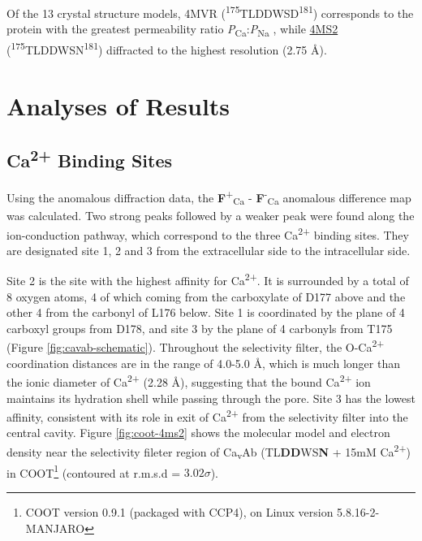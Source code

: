 \documentclass[
]{article}
\begin{document}
Of the 13 crystal structure models, 4MVR (\textsuperscript{175}TLDDWSD\textsuperscript{181}) corresponds to the protein with the greatest permeability ratio \emph{P}\textsubscript{Ca}:\emph{P}\textsubscript{Na} , while \href{https://www.rcsb.org/structure/4MS2}{4MS2} (\textsuperscript{175}TLDDWSN\textsuperscript{181}) diffracted to the highest resolution (2.75 Å).

\hypertarget{analyses-of-results}{%
\section{Analyses of Results}\label{analyses-of-results}}

\hypertarget{ca2-binding-sites}{%
\subsection{\texorpdfstring{Ca\textsuperscript{2+} Binding Sites}{Ca2+ Binding Sites}}\label{ca2-binding-sites}}

Using the anomalous diffraction data, the \textbf{F}\textsuperscript{+}\textsubscript{Ca} - \textbf{F}\textsuperscript{-}\textsubscript{Ca} anomalous difference map was calculated. Two strong peaks followed by a weaker peak were found along the ion-conduction pathway, which correspond to the three Ca\textsuperscript{2+} binding sites. They are designated site 1, 2 and 3 from the extracellular side to the intracellular side.

Site 2 is the site with the highest affinity for Ca\textsuperscript{2+}. It is surrounded by a total of 8 oxygen atoms, 4 of which coming from the carboxylate of D177 above and the other 4 from the carbonyl of L176 below. Site 1 is coordinated by the plane of 4 carboxyl groups from D178, and site 3 by the plane of 4 carbonyls from T175 (Figure \ref{fig:cavab-schematic}). Throughout the selectivity filter, the O-Ca\textsuperscript{2+} coordination distances are in the range of 4.0-5.0 Å, which is much longer than the ionic diameter of Ca\textsuperscript{2+} (2.28 Å), suggesting that the bound Ca\textsuperscript{2+} ion maintains its hydration shell while passing through the pore. Site 3 has the lowest affinity, consistent with its role in exit of Ca\textsuperscript{2+} from the selectivity filter into the central cavity. Figure \ref{fig:coot-4ms2} shows the molecular model and electron density near the selectivity fileter region of Ca\textsubscript{v}Ab (TL\textbf{DD}WS\textbf{N} + 15mM Ca\textsuperscript{2+}) in COOT\footnote{COOT version 0.9.1 (packaged with CCP4), on Linux version 5.8.16-2-MANJARO} (contoured at r.m.s.d = \(3.02 \sigma\)).
\end{document}
